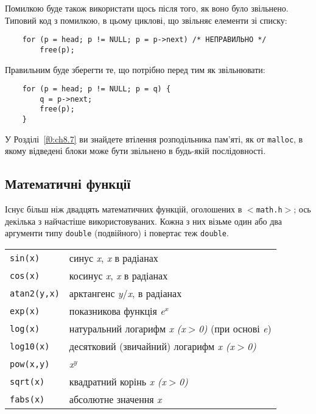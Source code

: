 \documentclass[a4paper,12pt]{book}
\begin{document}
  Помилкою буде також використати щось після того, як воно було звільнено. Типовий код
  з помилкою, в цьому циклові, що звільняє елементи зі списку:
  \begin{verbatim}
    for (p = head; p != NULL; p = p->next) /* НЕПРАВИЛЬНО */
        free(p);
  \end{verbatim}

  Правильним буде зберегти те, що потрібно перед тим як звільнювати:
  \begin{verbatim}
    for (p = head; p != NULL; p = q) {
        q = p->next;
        free(p);
    }
  \end{verbatim}

  У Розділі~\ref{f0:ch8.7} ви знайдете втілення розподільника пам'яті, як от
  \texttt{malloc}, в якому відведені блоки може бути звільнено в будь-якій послідовності.

\subsection{Математичні функції}


  Існує більш ніж двадцять математичних функцій, оголошених в \texttt{\mbox{$<$}math.h\mbox{$>$}}; ось
  декілька з найчастіше використовуваних. Кожна з них візьме один або два аргументи типу
  \texttt{double} (подвійного) і повертає теж \texttt{double}.

  \begin{center}
  \begin{tabular}{lp{12cm}}
  \texttt{sin(x)} & синус \textit{x}, \textit{x} в радіанах \\
  \texttt{cos(x)} & косинус \textit{x}, \textit{x} в радіанах \\
  \texttt{atan2(y,x)} & арктангенс \textit{y}/\textit{x}, в радіанах \\
  \texttt{exp(x)} & показникова функція \textit{e\(^{x}\)} \\
  \texttt{log(x)} & натуральний логарифм \textit{x (x\mbox{$>$}0)} (при основі \textit{e}) \\
  \texttt{log10(x)} & десятковий (звичайний) логарифм \textit{x (x\mbox{$>$}0)} \\
  \texttt{pow(x,y)} & \textit{x\(^{y}\)} \\
  \texttt{sqrt(x)} & квадратний корінь \textit{x (x\mbox{$>$}0)} \\
  \texttt{fabs(x)} & абсолютне значення \textit{x}
  \end{tabular}
  \end{center}
\end{document}
